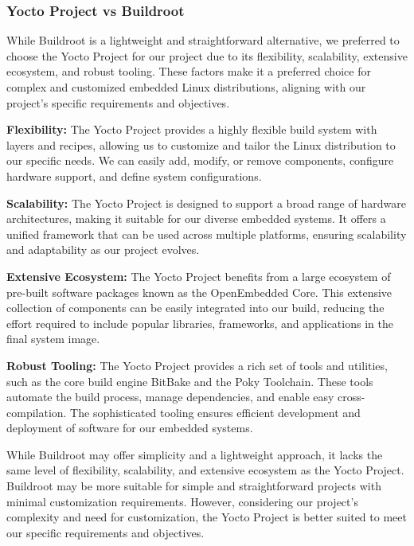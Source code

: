 \documentclass[
12pt,
oneside, 
onehalfspacing, 
nolistspacing, 
parskip, 
chapterinoneline, 
]{AASTCOMPUTER}
\begin{document}
\subsubsection{Yocto Project vs Buildroot}
While Buildroot is a lightweight and straightforward alternative, we preferred to choose the Yocto Project for our project due to its flexibility, scalability, extensive ecosystem, and robust tooling. These factors make it a preferred choice for complex and customized embedded Linux distributions, aligning with our project's specific requirements and objectives.

\textbf{Flexibility:} The Yocto Project provides a highly flexible build system with layers and recipes, allowing us to customize and tailor the Linux distribution to our specific needs. We can easily add, modify, or remove components, configure hardware support, and define system configurations.

\textbf{Scalability:} The Yocto Project is designed to support a broad range of hardware architectures, making it suitable for our diverse embedded systems. It offers a unified framework that can be used across multiple platforms, ensuring scalability and adaptability as our project evolves.

\textbf{Extensive Ecosystem:} The Yocto Project benefits from a large ecosystem of pre-built software packages known as the OpenEmbedded Core. This extensive collection of components can be easily integrated into our build, reducing the effort required to include popular libraries, frameworks, and applications in the final system image.

\textbf{Robust Tooling:} The Yocto Project provides a rich set of tools and utilities, such as the core build engine BitBake and the Poky Toolchain. These tools automate the build process, manage dependencies, and enable easy cross-compilation. The sophisticated tooling ensures efficient development and deployment of software for our embedded systems.

While Buildroot may offer simplicity and a lightweight approach, it lacks the same level of flexibility, scalability, and extensive ecosystem as the Yocto Project. Buildroot may be more suitable for simple and straightforward projects with minimal customization requirements. However, considering our project's complexity and need for customization, the Yocto Project is better suited to meet our specific requirements and objectives.
\end{document}
